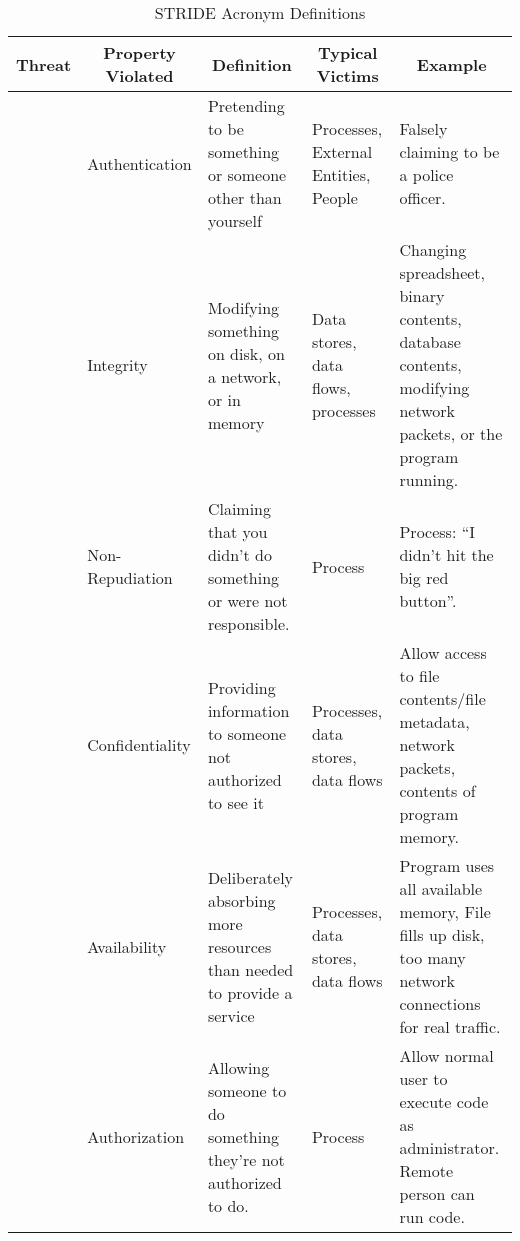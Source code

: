 \begin{table}[h!]
  \centering
  \begin{tabular}{p{1.5cm}p{2.75cm}p{4cm}p{4cm}p{4cm}}
    \toprule
    \multicolumn{1}{c}{Threat} & \multicolumn{1}{c}{Property Violated} & \multicolumn{1}{c}{Definition} & \multicolumn{1}{c}{Typical Victims} & \multicolumn{1}{c}{Example} \\
    \midrule
    \nameref{def:Spoofing} & Authentication & Pretending to be something or someone other than yourself & Processes, External Entities, People & Falsely claiming to be a police officer. \\ \midrule
    \nameref{def:Tampering} & Integrity & Modifying something on disk, on a network, or in memory & Data stores, data flows, processes & Changing spreadsheet, binary contents, database contents, modifying network packets, or the program running. \\ \midrule
    \nameref{def:Repudiation} & Non-Repudiation & Claiming that you didn't do something or were not responsible. & Process & Process: ``I didn't hit the big red button''. \\ \midrule
    \nameref{def:Information_Disclosure} & Confidentiality & Providing information to someone not authorized to see it & Processes, data stores, data flows & Allow access to file contents/file metadata, network packets, contents of program memory. \\ \midrule
    \nameref{def:Denial_of_Service} & Availability & Deliberately absorbing more resources than needed to provide a service & Processes, data stores, data flows & Program uses all available memory, File fills up disk, too many network connections for real traffic. \\ \midrule
    \nameref{def:Elevation_of_Privilege} & Authorization & Allowing someone to do something they're not authorized to do. & Process & Allow normal user to execute code as administrator. Remote person can run code. \\
    \bottomrule
  \end{tabular}
  \caption{STRIDE Acronym Definitions}
  \label{tab:STRIDE_Analysis_Definitions}
\end{table}
